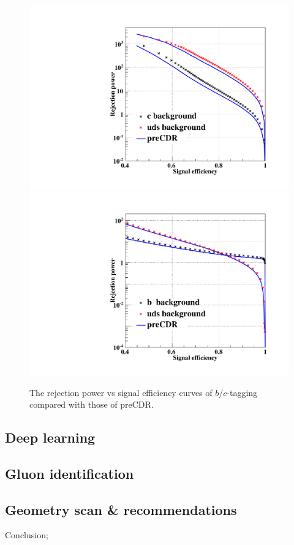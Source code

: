 \begin{figure}[h!]
\centering
\includegraphics[scale=0.40]{Figures/Performance/ft/rejectionB-test}
\includegraphics[scale=0.40]{Figures/Performance/ft/rejectionC-test}
\caption{The rejection power vs signal efficiency curves of $b/c$-tagging compared with those of preCDR.  }
\label{fig:ft-rej}
\end{figure}


\subsection{Deep learning}

\subsection{Gluon identification}

\subsection{Geometry scan \& recommendations}

Conclusion;



 
